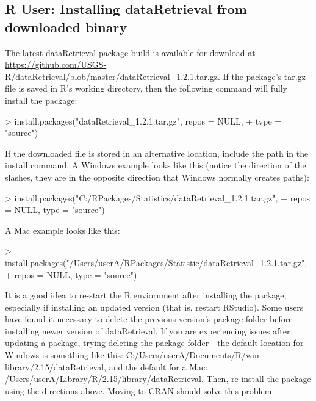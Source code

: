 \documentclass[a4paper,11pt]{article}
\begin{document}
\subsection{R User: Installing dataRetrieval from downloaded binary}
The latest dataRetrieval package build is available for download at \url{https://github.com/USGS-R/dataRetrieval/blob/master/dataRetrieval_1.2.1.tar.gz}.  If the package's tar.gz file is saved in R's working directory, then the following command will fully install the package:

\begin{Schunk}
\begin{Sinput}
> install.packages("dataRetrieval_1.2.1.tar.gz", repos = NULL, 
+     type = "source")
\end{Sinput}
\end{Schunk}

If the downloaded file is stored in an alternative location, include the path in the install command.  A Windows example looks like this (notice the direction of the slashes, they are in the opposite direction that Windows normally creates paths):

\begin{Schunk}
\begin{Sinput}
> install.packages("C:/RPackages/Statistics/dataRetrieval_1.2.1.tar.gz", 
+     repos = NULL, type = "source")
\end{Sinput}
\end{Schunk}

A Mac example looks like this:

\begin{Schunk}
\begin{Sinput}
> install.packages("/Users/userA/RPackages/Statistic/dataRetrieval_1.2.1.tar.gz", 
+     repos = NULL, type = "source")
\end{Sinput}
\end{Schunk}

It is a good idea to re-start the R enviornment after installing the package, especially if installing an updated version (that is, restart RStudio). Some users have found it necessary to delete the previous version's package folder before installing newer version of dataRetrieval. If you are experiencing issues after updating a package, trying deleting the package folder - the default location for Windows is something like this: C:/Users/userA/Documents/R/win-library/2.15/dataRetrieval, and the default for a Mac: /Users/userA/Library/R/2.15/library/dataRetrieval. Then, re-install the package using the directions above. Moving to CRAN should solve this problem.
\end{document}
